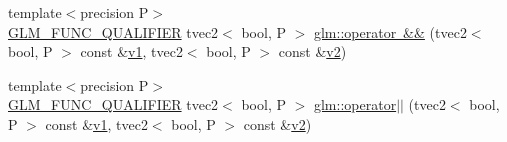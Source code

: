 \begin{DoxyCompactItemize}
\item 
{\footnotesize template$<$precision P$>$ }\\\mbox{\hyperlink{setup_8hpp_a33fdea6f91c5f834105f7415e2a64407}{G\+L\+M\+\_\+\+F\+U\+N\+C\+\_\+\+Q\+U\+A\+L\+I\+F\+I\+ER}} tvec2$<$ bool, P $>$ \mbox{\hyperlink{namespaceglm_a54da90c97e8a432aa8360f32452c64ca}{glm\+::operator \&\&}} (tvec2$<$ bool, P $>$ const \&\mbox{\hyperlink{glad_8h_a0779c3b73f9aa3a0ac5b0139b5d291d9}{v1}}, tvec2$<$ bool, P $>$ const \&\mbox{\hyperlink{glad_8h_a9a09a1837922b2b806f4589096a52049}{v2}})
\item 
{\footnotesize template$<$precision P$>$ }\\\mbox{\hyperlink{setup_8hpp_a33fdea6f91c5f834105f7415e2a64407}{G\+L\+M\+\_\+\+F\+U\+N\+C\+\_\+\+Q\+U\+A\+L\+I\+F\+I\+ER}} tvec2$<$ bool, P $>$ \mbox{\hyperlink{namespaceglm_ab05d405a1ad436e05b9cdec540b3463e}{glm\+::operator$\vert$$\vert$}} (tvec2$<$ bool, P $>$ const \&\mbox{\hyperlink{glad_8h_a0779c3b73f9aa3a0ac5b0139b5d291d9}{v1}}, tvec2$<$ bool, P $>$ const \&\mbox{\hyperlink{glad_8h_a9a09a1837922b2b806f4589096a52049}{v2}})
\end{DoxyCompactItemize}

